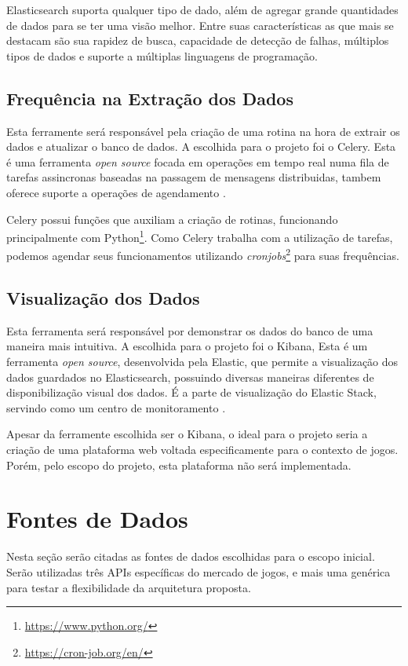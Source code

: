 Elasticsearch suporta qualquer tipo de dado, além de agregar grande quantidades de dados para se ter uma visão melhor. Entre suas características as que mais se destacam são sua rapidez de busca, capacidade de detecção de falhas, múltiplos tipos de dados e suporte a múltiplas linguagens de programação.
\subsection{Frequência na Extração dos Dados}
Esta ferramente será responsável pela criação de uma rotina na hora de extrair os dados e atualizar o banco de dados. A escolhida para o projeto foi o Celery. Esta é uma ferramenta \textit{open source} focada em operações em tempo real numa fila de tarefas assincronas baseadas na passagem de mensagens distribuidas, tambem oferece suporte a operações de agendamento \cite{celery}.

Celery possui funções que auxiliam a criação de rotinas, funcionando principalmente com Python\footnote[2]{\url{https://www.python.org/}}. Como Celery trabalha com a utilização de tarefas, podemos agendar seus funcionamentos utilizando \textit{cronjobs}\footnote[3]{\url{https://cron-job.org/en/}} para suas frequências.
\subsection{Visualização dos Dados}
Esta ferramenta será responsável por demonstrar os dados do banco de uma maneira mais intuitiva. A escolhida para o projeto foi o Kibana, Esta é um ferramenta \textit{open source}, desenvolvida pela Elastic, que permite a visualização dos dados guardados no Elasticsearch, possuindo diversas maneiras diferentes de disponibilização visual dos dados. É a parte de visualização do Elastic Stack, servindo como um centro de monitoramento \cite{kibana}.

Apesar da ferramente escolhida ser o Kibana, o ideal para o projeto seria a criação de uma plataforma web voltada especificamente para o contexto de jogos. Porém, pelo escopo do projeto, esta plataforma não será implementada.

\section{Fontes de Dados}
Nesta seção serão citadas as fontes de dados escolhidas para o escopo inicial. Serão utilizadas três APIs específicas do mercado de jogos, e mais uma genérica para testar a flexibilidade da arquitetura proposta.

